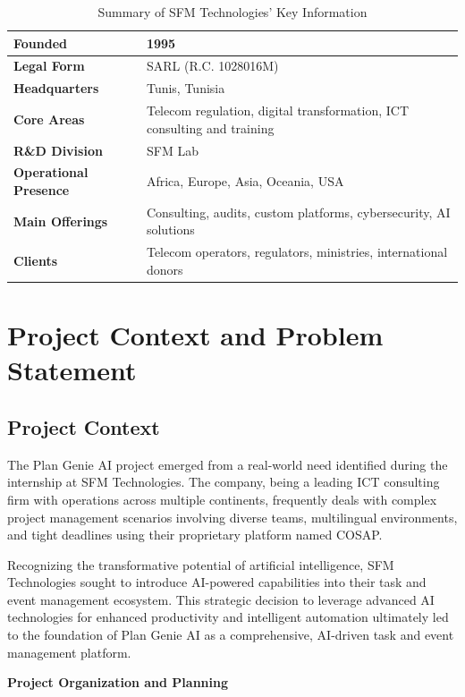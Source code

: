 \documentclass[12pt,a4paper]{article}
\begin{document}
\begin{table}[H]
\centering
\begin{tabular}{|l|l|}
\hline
\textbf{Founded} & 1995 \\
\hline
\textbf{Legal Form} & SARL (R.C. 1028016M) \\
\hline
\textbf{Headquarters} & Tunis, Tunisia \\
\hline
\textbf{Core Areas} & Telecom regulation, digital transformation, ICT consulting and training \\
\hline
\textbf{R\&D Division} & SFM Lab \\
\hline
\textbf{Operational Presence} & Africa, Europe, Asia, Oceania, USA \\
\hline
\textbf{Main Offerings} & Consulting, audits, custom platforms, cybersecurity, AI solutions \\
\hline
\textbf{Clients} & Telecom operators, regulators, ministries, international donors \\
\hline
\end{tabular}
\caption{Summary of SFM Technologies' Key Information}
\end{table}

\section{Project Context and Problem Statement}

\subsection{Project Context}
The Plan Genie AI project emerged from a real-world need identified during the internship at SFM Technologies. The company, being a leading ICT consulting firm with operations across multiple continents, frequently deals with complex project management scenarios involving diverse teams, multilingual environments, and tight deadlines using their proprietary platform named COSAP. 

Recognizing the transformative potential of artificial intelligence, SFM Technologies sought to introduce AI-powered capabilities into their task and event management ecosystem. This strategic decision to leverage advanced AI technologies for enhanced productivity and intelligent automation ultimately led to the foundation of Plan Genie AI as a comprehensive, AI-driven task and event management platform.

\newpage
\textbf{Project Organization and Planning}
\end{document}
